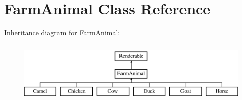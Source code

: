 \hypertarget{class_farm_animal}{}\section{Farm\+Animal Class Reference}
\label{class_farm_animal}
Inheritance diagram for Farm\+Animal\+:\begin{figure}[H]
\begin{center}
\leavevmode
\includegraphics[height=3.000000cm]{class_farm_animal}
\end{center}
\end{figure}
